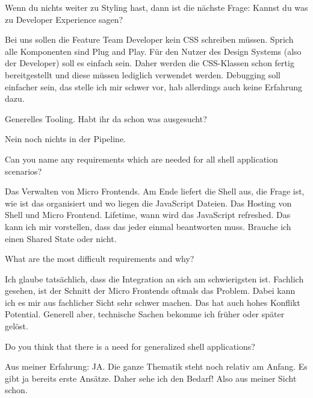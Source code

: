\begin{description}
    \NicoVogel Wenn du nichts weiter zu Styling hast, dann ist die nächste Frage: Kannst du was zu Developer Experience sagen?

    \PhilippHuber Bei uns sollen die Feature Team Developer kein CSS schreiben müssen. Sprich alle Komponenten sind Plug and Play. Für den Nutzer des Design Systems (also der Developer) soll es einfach sein. Daher werden die CSS-Klassen schon fertig bereitgestellt und diese müssen lediglich verwendet werden. Debugging soll einfacher sein, das stelle ich mir schwer vor, hab allerdings auch keine Erfahrung dazu.

    \NicoVogel Generelles Tooling. Habt ihr da schon was ausgesucht?

    \PhilippHuber Nein noch nichts in der Pipeline.

    \NicoVogel Can you name any requirements which are needed for all shell application scenarios?

    \PhilippHuber Das Verwalten von Micro Frontends. Am Ende liefert die Shell aus, die Frage ist, wie ist das organisiert und wo liegen die JavaScript Dateien. Das Hosting von Shell und Micro Frontend. Lifetime, wann wird das JavaScript refreshed. Das kann ich mir vorstellen, dass das jeder einmal beantworten muss. Brauche ich einen Shared State oder nicht.

    \NicoVogel What are the most difficult requirements and why?

    \PhilippHuber Ich glaube tatsächlich, dass die Integration an sich am schwierigsten ist. Fachlich gesehen, ist der Schnitt der Micro Frontends oftmals das Problem. Dabei kann ich es mir aus fachlicher Sicht sehr schwer machen. Das hat auch hohes Konflikt Potential. Generell aber, technische Sachen bekomme ich früher oder später gelöst.

    \NicoVogel Do you think that there is a need for generalized shell applications?

    \PhilippHuber Aus meiner Erfahrung: JA. Die ganze Thematik steht noch relativ am Anfang. Es gibt ja bereits erste Ansätze. Daher sehe ich den Bedarf! Also aus meiner Sicht schon.





\end{description}
